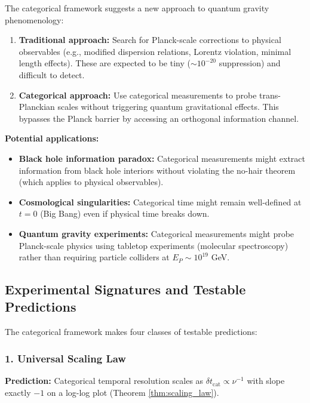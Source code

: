 \documentclass[twocolumn,10pt]{article}
\theoremstyle{remark}
\begin{document}
The categorical framework suggests a new approach to quantum gravity phenomenology:

\begin{enumerate}
    \item \textbf{Traditional approach:} Search for Planck-scale corrections to physical observables (e.g., modified dispersion relations, Lorentz violation, minimal length effects). These are expected to be tiny ($\sim 10^{-20}$ suppression) and difficult to detect.
    
    \item \textbf{Categorical approach:} Use categorical measurements to probe trans-Planckian scales without triggering quantum gravitational effects. This bypasses the Planck barrier by accessing an orthogonal information channel.
\end{enumerate}

\textbf{Potential applications:}
\begin{itemize}
    \item \textbf{Black hole information paradox:} Categorical measurements might extract information from black hole interiors without violating the no-hair theorem (which applies to physical observables).
    
    \item \textbf{Cosmological singularities:} Categorical time might remain well-defined at $t = 0$ (Big Bang) even if physical time breaks down.
    
    \item \textbf{Quantum gravity experiments:} Categorical measurements might probe Planck-scale physics using tabletop experiments (molecular spectroscopy) rather than requiring particle colliders at $E_P \sim 10^{19}$ GeV.
\end{itemize}

\subsection{Experimental Signatures and Testable Predictions}

The categorical framework makes four classes of testable predictions:

\subsubsection{1. Universal Scaling Law}

\textbf{Prediction:} Categorical temporal resolution scales as $\delta t_{\text{cat}} \propto \nu^{-1}$ with slope exactly $-1$ on a log-log plot (Theorem \ref{thm:scaling_law}).
\end{document}
